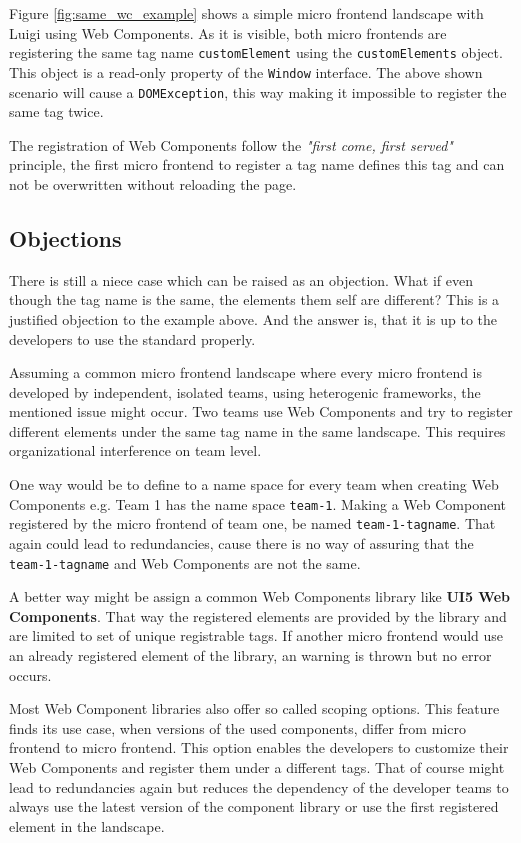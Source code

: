 Figure \ref{fig:same_wc_example} shows a simple micro frontend landscape with Luigi using Web Components. As it is visible, both micro frontends are registering the same tag name \texttt{customElement} using the \texttt{customElements} object. This object is a read-only property of the \texttt{Window} interface.
The above shown scenario will cause a  \texttt{DOMException}, this way making it impossible to register the same tag twice.

The registration of Web Components follow the \textit{"first come, first served"} principle, the first micro frontend to register a tag name defines this tag and can not be overwritten without reloading the page.\cite{mdn_web_docs_define}

\subsection{Objections}

There is still a niece case which can be raised as an objection. What if even though the tag name is the same, the elements them self are different? This is a justified objection to the example above. And the answer is, that it is up to the developers to use the standard properly.

Assuming a common micro frontend landscape where every micro frontend is developed by independent, isolated teams, using heterogenic frameworks, the mentioned issue might occur. Two teams use Web Components and try to register different elements under the same tag name in the same landscape. This requires organizational interference on team level.

One way would be to define to a name space for every team when creating Web Components e.g. Team 1 has the name space \texttt{team-1}. Making a Web Component registered by the micro frontend of team one, be named \texttt{team-1-tagname}. That again could lead to redundancies, cause there is no way of assuring that the \texttt{team-1-tagname} and  Web Components are not the same.\cite{wc_best_practices}

A better way might be assign a common Web Components library like \textbf{UI5 Web Components}. That way the registered elements are provided by the library and are limited to set of unique registrable tags. If another micro frontend would use an already registered element of the library, an warning is thrown but no error occurs.

Most Web Component libraries also offer so called scoping options. This feature finds its use case, when versions of the used components, differ from micro frontend to micro frontend. This option enables the developers to customize their Web Components and register them under a different tags. That of course might lead to redundancies again but reduces the dependency of the developer teams to always use the latest version of the component library or use the first registered element in the landscape. \cite{ui5_webcomponents_scoping} \cite{openwc_scoping}

